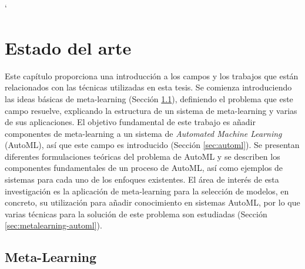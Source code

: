 `\chapter{Estado del arte }\label{chapter:review}

 
 Este capítulo proporciona una introducción a los campos y los trabajos que están relacionados con las técnicas utilizadas en esta tesis. Se comienza introduciendo las ideas básicas de meta-learning (Sección \ref{sec:metalearning}), definiendo el problema que este campo resuelve, explicando la estructura de un sistema de meta-learning y varias de sus aplicaciones. El objetivo fundamental de este trabajo es añadir componentes de meta-learning a un sistema de \textit{Automated Machine Learning} (AutoML), así que este campo es introducido (Sección \ref{sec:automl}). Se presentan diferentes formulaciones teóricas del problema de AutoML y se describen los componentes fundamentales de un proceso de AutoML, así como ejemplos de sistemas para cada uno de los enfoques existentes. El área de interés de esta investigación es la aplicación de meta-learning para la selección de modelos, en concreto, su utilización para añadir conocimiento en sistemas AutoML, por lo que varias técnicas para la solución de este problema son estudiadas (Sección \ref{sec:metalearning-automl}).

\section{Meta-Learning}\label{sec:metalearning}

